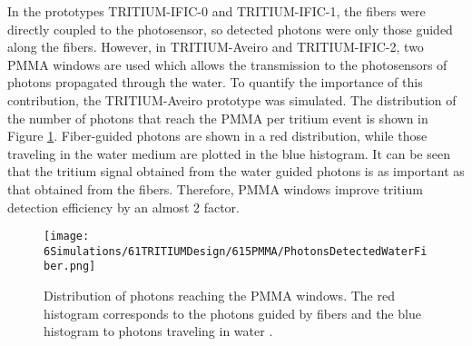 In the prototypes TRITIUM-IFIC-0 and TRITIUM-IFIC-1, the fibers were directly coupled to the photosensor, so detected photons were only those guided along the fibers. However, in TRITIUM-Aveiro and TRITIUM-IFIC-2, two PMMA windows are used which allows the transmission to the photosensors of photons propagated through the water. To quantify the importance of this contribution, the TRITIUM-Aveiro prototype was simulated. The distribution of the number of photons that reach the PMMA per tritium event is shown in Figure \ref{fig:PMMAEffect}. Fiber-guided photons are shown in a red distribution, while those traveling in the water medium are plotted in the blue histogram. It can be seen that the tritium signal obtained from the water guided photons is as important as that obtained from the fibers. Therefore, PMMA windows improve tritium detection efficiency by an almost 2 factor.

\begin{figure}[hbtp]
\centering
\texttt{[image: 6Simulations/61TRITIUMDesign/615PMMA/PhotonsDetectedWaterFiber.png]}
\caption{Distribution of photons reaching the PMMA windows. The red histogram corresponds to the photons guided by fibers and the blue histogram to photons traveling in water \cite{SimulationPaperCarlos}.\label{fig:PMMAEffect}}
\end{figure}

